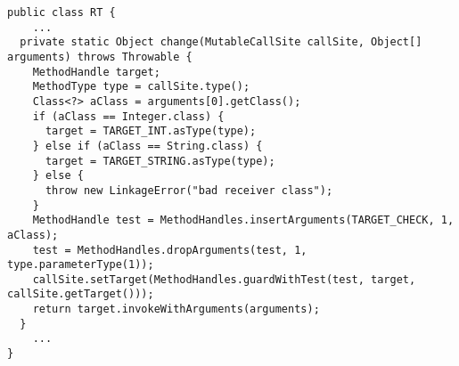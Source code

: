 {\tiny \begin{verbatim}
public class RT {
    ...
  private static Object change(MutableCallSite callSite, Object[] arguments) throws Throwable {
    MethodHandle target;
    MethodType type = callSite.type();
    Class<?> aClass = arguments[0].getClass();
    if (aClass == Integer.class) {
      target = TARGET_INT.asType(type);
    } else if (aClass == String.class) {
      target = TARGET_STRING.asType(type);
    } else {
      throw new LinkageError("bad receiver class");
    }
    MethodHandle test = MethodHandles.insertArguments(TARGET_CHECK, 1, aClass);
    test = MethodHandles.dropArguments(test, 1, type.parameterType(1));
    callSite.setTarget(MethodHandles.guardWithTest(test, target, callSite.getTarget()));
    return target.invokeWithArguments(arguments);
  }
    ...
}
\end{verbatim} }
